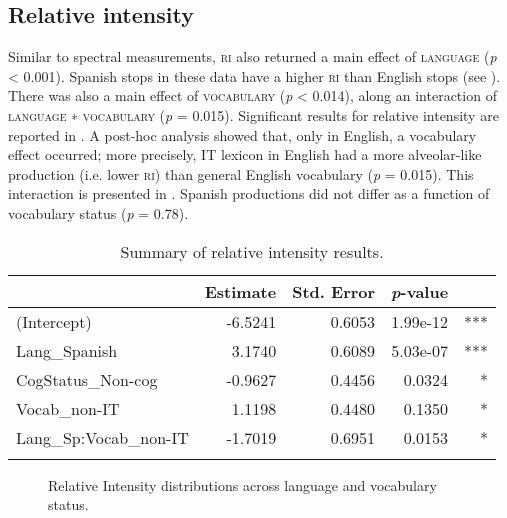 \documentclass[output=paper,colorlinks,citecolor=brown,
]{langscibook}
\begin{document}
\subsection{Relative intensity}

Similar to spectral measurements, \textsc{ri} also returned a main effect of \textsc{language} (\textit{p} \textless{} 0.001). Spanish stops in these data have a higher \textsc{ri} than English stops (see ). There was also a main effect of \textsc{vocabulary} (\textit{p} \textless{} 0.014), along an interaction of \textsc{language} ∗ \textsc{vocabulary} (\textit{p} = 0.015). Significant results for relative intensity are reported in . A post-hoc analysis showed that, only in English, a vocabulary effect occurred; more precisely, IT lexicon in English had a more alveolar-like production (i.e. lower \textsc{ri}) than general English vocabulary (\textit{p} = 0.015). This interaction is presented in . Spanish productions did not differ as a function of vocabulary status (\textit{p} = 0.78).

\begin{table}
\caption{Summary of relative intensity results.}
\label{tab:gutierrez:ri_results}
 \begin{tabular}{lrrrr}
 \lsptoprule
 & Estimate & Std. Error & \textit{p}-value &  \\
 \midrule
 (Intercept) & -6.5241 & 0.6053 & 1.99e-12 & *** \\
 Lang\_Spanish & 3.1740 & 0.6089 & 5.03e-07 & *** \\
 CogStatus\_Non-cog & -0.9627 & 0.4456 & 0.0324 & * \\
 Vocab\_non-IT & 1.1198 & 0.4480 & 0.1350 & * \\
 Lang\_Sp:Vocab\_non-IT & -1.7019 & 0.6951 & 0.0153 & * \\
 \lspbottomrule
 \end{tabular}
\end{table}

\begin{figure}
    \qquad
    \caption{Relative Intensity distributions across language and vocabulary status.}%
    \label{fig:gutierrez:ri_graphs}%
\end{figure}
\end{document}
